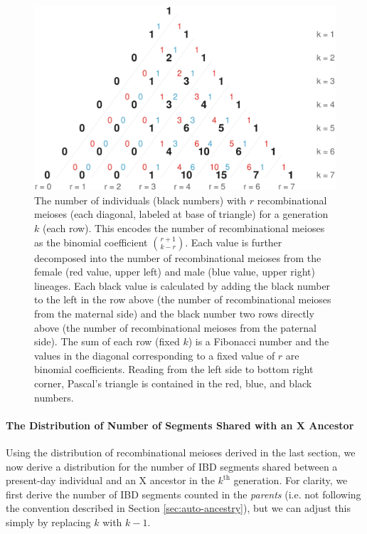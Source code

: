 \documentclass[9pt,twocolumn,twoside]{gsajnl}
\begin{document}
\begin{figure}[!ht]
  \centering
  \includegraphics[width=\linewidth]{images/bifib}

  \caption{The number of individuals (black numbers) with $r$ recombinational
    meioses (each diagonal, labeled at base of triangle) for a generation $k$
    (each row). This encodes the number of recombinational meioses as the
    binomial coefficient ${r + 1 \choose k - r}$. Each value is further
    decomposed into the number of recombinational meioses from the female (red
    value, upper left) and male (blue value, upper right) lineages. Each black
    value is calculated by adding the black number to the left in the row above
    (the number of recombinational meioses from the maternal side) and the
    black number two rows directly above (the number of recombinational meioses
    from the paternal side). The sum of each row (fixed $k$) is a Fibonacci
    number and the values in the diagonal corresponding to a fixed value of $r$
    are binomial coefficients. Reading from the left side to bottom right
    corner, Pascal's triangle is contained in the red, blue, and black numbers.}

  \label{fig:pascals-bifib}

\end{figure}


\paragraph{The Distribution of Number of Segments Shared with an X Ancestor}

Using the distribution of recombinational meioses derived in the last section,
we now derive a distribution for the number of IBD segments shared between a
present-day individual and an X ancestor in the $k^\text{th}$ generation. For
clarity, we first derive the number of IBD segments counted in the
\emph{parents} (i.e. not following the convention described in Section
\ref{sec:auto-ancestry}), but we can adjust this simply by replacing $k$ with
$k-1$.
\end{document}
